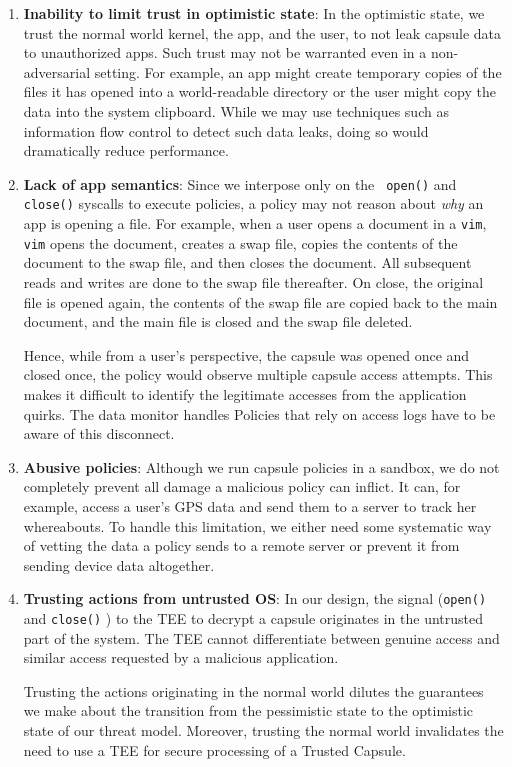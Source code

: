 \begin{enumerate}
    \item {\bf Inability to limit trust in optimistic state}: In the optimistic
state, we trust the normal world kernel, the app, and the user, to not leak
capsule data to unauthorized apps. Such trust may not be warranted even in a
non-adversarial setting. For example, an app might create temporary copies of
the files it has opened into a world-readable directory or the user might copy
the data into the system clipboard. While we may use techniques such as
information flow control to detect such data leaks, doing so would dramatically reduce performance.

    \item {\bf Lack of app semantics}: Since we interpose only on the {\tt
    open()} and {\tt close()} syscalls to execute policies, a policy may not
    reason about {\em why} an app is opening a file. For example, when a user opens a document in a  \texttt{vim}, \texttt{vim} opens the document, creates a swap file, copies the contents of the document to the swap file, and then closes the document. All subsequent reads and writes are done to the swap file thereafter. On close, the original file is opened again, the contents of the swap file are copied back to the main document, and the main file is closed and the swap file deleted. 
    
    Hence, while from a user's perspective, the capsule was opened once and closed once, the policy would observe multiple capsule access attempts. This makes it difficult to identify the legitimate accesses from the application quirks. The data monitor handles Policies that rely on access logs have to be aware of this disconnect.

    \item {\bf Abusive policies}: Although we run capsule policies in a sandbox,
we do not completely prevent all damage a malicious policy can inflict. It can,
for example, access a user's GPS data and send them to a server to track her whereabouts. To handle this limitation, we either need some
systematic way of vetting the data a policy sends to a remote server or prevent
it from sending device data altogether.

    \item{\bf Trusting actions from untrusted OS}: In our design, the signal
    ({\tt open()} and {\tt close()} ) to the TEE to decrypt a capsule originates in the untrusted part of the system. The TEE cannot differentiate between genuine access and similar access requested by a malicious application.
    
    Trusting the actions originating in the normal world dilutes the guarantees we make about the transition from the pessimistic state to the optimistic state of our threat model. Moreover, trusting the normal world invalidates
    the need to use a TEE for secure processing of a Trusted Capsule.
    
\end{enumerate}

